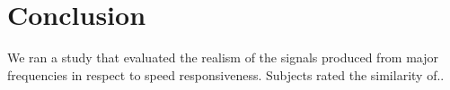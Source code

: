 \chapter{Conclusion}
\thispagestyle{empty}%
We ran a study that evaluated the realism of the signals produced from major frequencies in respect to speed responsiveness. Subjects rated the similarity of..